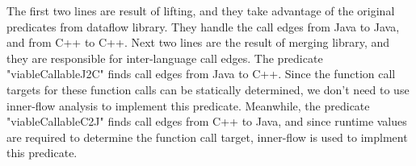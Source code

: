 The first two lines are result of lifting, and they take advantage of the original predicates from dataflow library.
They handle the call edges from Java to Java, and from C++ to C++.
Next two lines are the result of merging library, and they are responsible for inter-language call edges.
The predicate "viableCallableJ2C" finds call edges from Java to C++. Since the function call targets for
these function calls can be statically determined, we don't need to use inner-flow analysis to implement this predicate.
Meanwhile, the predicate "viableCallableC2J" finds call edges from C++ to Java, and since runtime values are required to
determine the function call target, inner-flow is used to implment this predicate.
